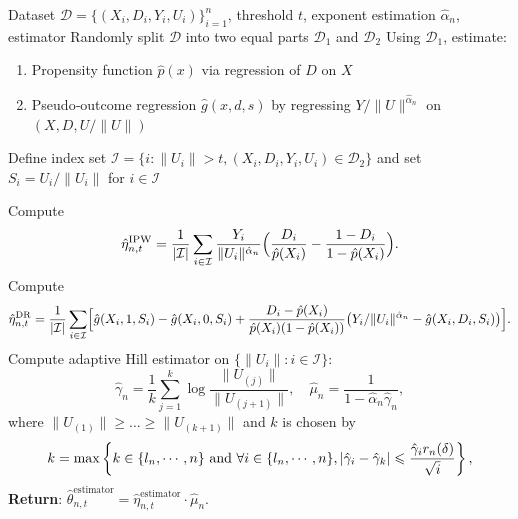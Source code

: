 \documentclass[12pt]{article}
\theoremstyle{plain}
\theoremstyle{definition}
\begin{document}
\begin{algorithm}[!tb]
  \caption{Algorithm for NETE Estimation}\label{alg:nete}
  \begin{algorithmic}[1]
    \REQUIRE Dataset $\mathcal{D}=\{(X_i,D_i,Y_i,U_i)\}_{i=1}^n$, threshold $t$, exponent estimation $ \hat{\alpha}_{n} $, estimator
    \STATE Randomly split $\mathcal{D}$ into two equal parts $\mathcal{D}_1$ and $\mathcal{D}_2$
    \STATE Using $\mathcal{D}_1$, estimate:
    \begin{enumerate}[label=\alph*.]
      \item Propensity function $\hat p(x)$ via regression of $D$ on $X$
      \item Pseudo‐outcome regression $\hat g(x,d,s)$ by regressing $Y/\|U\|^{\hat{\alpha}_{n}}$ on $(X,D,U/\|U\|)$
    \end{enumerate}
    \STATE Define index set $\mathcal{I}=\{i:\|U_i\|>t, (X_i,D_i,Y_i,U_i)\in\mathcal{D}_2\}$ and set $S_i=U_i/\|U_i\|$ for $i\in\mathcal{I}$
    
        \STATE Compute
        \begin{equation}
            \hat\eta_{n,t}^{\mathrm{IPW}}
          = \frac{1}{|\mathcal{I}|} \sum_{i\in\mathcal{I}} \frac{Y_i}{\|U_i\|^{\hat{\alpha}_n} } \Bigl(\frac{D_i}{\hat p(X_i)} - \frac{1-D_i}{1-\hat p(X_i)}\Bigr).\label{eq:eta_ipw}
        \end{equation}
      \ELSE
        \STATE Compute
        \begin{equation}
            \hat\eta_{n,t}^{\mathrm{DR}} = \frac{1}{|\mathcal{I}|} \sum_{i\in\mathcal{I}}\Bigl[\hat g(X_i,1,S_i)-\hat g(X_i,0,S_i)
          + \frac{D_i-\hat p(X_i)}{\hat p(X_i)(1-\hat p(X_i))}\bigl(Y_i/\|U_i\|^{\hat{\alpha}_{n}}-\hat g(X_i,D_i,S_i)\bigr)\Bigr]. \label{eq:eta_dr}
        \end{equation}
      \ENDIF
      \STATE Compute adaptive Hill estimator on $\{\|U_i\|:i\in\mathcal{I}\}$:
      \begin{equation}\label{eq:mu}
          \hat\gamma_n = \frac{1}{k} \sum_{j=1}^{k} \log\frac{\|U_{(j)}\|}{\|U_{(j+1)}\|}, \quad
        \hat\mu_n = \frac{1}{1-\hat{\alpha}_{n}\hat\gamma_n},
      \end{equation}
      where $\|U_{(1)}\|\ge\dots\ge\|U_{(k+1)}\|$ and $k$ is chosen by 
      \begin{equation}
           k  = \max \left\{ k \in \{l_n, \cdots, n\} \  \text{and} \  \forall i \in \{l_n,\cdots, n\}, | \hat{\gamma}_i - \hat{\gamma}_k | \leqslant \frac{\hat{\gamma}_i r_n (\delta)}{\sqrt{i}} \right\}, \notag
      \end{equation}
    \textbf{Return}:  $\widehat{\theta}_{n,t}^{\mathrm{estimator}} =  \hat\eta_{n,t}^{\mathrm{estimator}}\cdot\hat\mu_n.$
  \end{algorithmic}
\end{algorithm}
\end{document}
